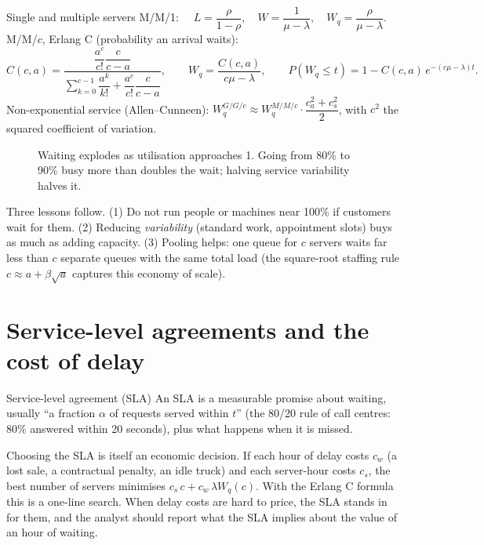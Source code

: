 \begin{keyformula}{Single and multiple servers}
M/M/1: $\quad L=\dfrac{\rho}{1-\rho},\quad W=\dfrac{1}{\mu-\lambda},\quad W_q=\dfrac{\rho}{\mu-\lambda}$.\\[4pt]
M/M/$c$, Erlang C (probability an arrival waits):
\[ C(c,a)=\frac{\dfrac{a^c}{c!}\dfrac{c}{c-a}}{\sum_{k=0}^{c-1}\dfrac{a^k}{k!}+\dfrac{a^c}{c!}\dfrac{c}{c-a}},\qquad
W_q=\frac{C(c,a)}{c\mu-\lambda},\qquad P(W_q\le t)=1-C(c,a)\,e^{-(c\mu-\lambda)t}. \]
Non-exponential service (Allen--Cunneen): $W_q^{G/G/c}\approx W_q^{M/M/c}\cdot\dfrac{c_a^2+c_s^2}{2}$, with $c^2$ the squared
coefficient of variation.
\end{keyformula}

\begin{figure}[H]
\centering
{}
\caption{Waiting explodes as utilisation approaches 1. Going from 80\% to 90\% busy more than doubles the wait;
halving service variability halves it.}
\end{figure}

Three lessons follow. (1) Do not run people or machines near 100\% if customers wait for them. (2) Reducing
\emph{variability} (standard work, appointment slots) buys as much as adding capacity. (3) Pooling helps: one queue
for $c$ servers waits far less than $c$ separate queues with the same total load (the square-root staffing rule
$c\approx a+\beta\sqrt a$ captures this economy of scale).

\section{Service-level agreements and the cost of delay}
\begin{definition}{Service-level agreement (SLA)}
An SLA is a measurable promise about waiting, usually ``a fraction $\alpha$ of requests served within $t$''
(the 80/20 rule of call centres: 80\% answered within 20 seconds), plus what happens when it is missed.
\end{definition}
Choosing the SLA is itself an economic decision. If each hour of delay costs $c_w$ (a lost sale, a contractual
penalty, an idle truck) and each server-hour costs $c_s$, the best number of servers minimises $c_s\,c+c_w\,\lambda W_q(c)$.
With the Erlang C formula this is a one-line search. When delay costs are hard to price, the SLA stands in for them,
and the analyst should report what the SLA implies about the value of an hour of waiting.

